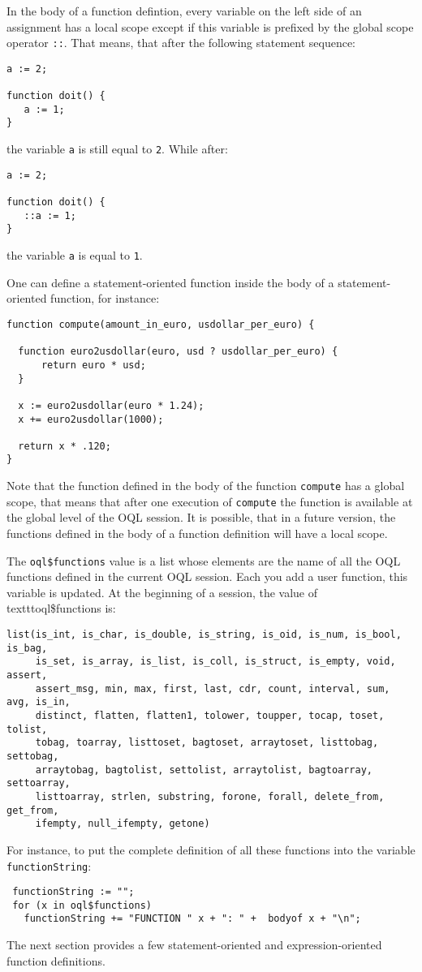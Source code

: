 In the body of a function defintion, every variable on the left side of an
assignment has a local scope except if this variable is prefixed by
the global scope operator \texttt{::}.
That means, that after the following statement sequence:
\begin{verbatim}
a := 2;

function doit() {
   a := 1;
}
\end{verbatim}
the variable \texttt{a} is still equal to \texttt{2}. While after:
\begin{verbatim}
a := 2;

function doit() {
   ::a := 1;
}
\end{verbatim}
the variable \texttt{a} is equal to \texttt{1}.

One can define a statement-oriented function inside the body of
a statement-oriented function, for instance:
\begin{verbatim}
function compute(amount_in_euro, usdollar_per_euro) {

  function euro2usdollar(euro, usd ? usdollar_per_euro) {
      return euro * usd;
  }

  x := euro2usdollar(euro * 1.24);
  x += euro2usdollar(1000);

  return x * .120;
}
\end{verbatim}

Note that the function defined in the body of the function \texttt{compute}
has a global scope, that means that after one execution of \texttt{compute}
the function is available at the global level of the OQL session.
It is possible, that in a future version, the functions defined in
the body of a function definition will have a local scope.

The \texttt{oql\$functions} value is a list whose elements are the name of all
the OQL functions
defined in the current OQL session. Each you add a user function,
this variable is updated.
At the beginning of a session,
the value of \\texttt{oql\$functions} is:
\begin{verbatim}
list(is_int, is_char, is_double, is_string, is_oid, is_num, is_bool, is_bag,
     is_set, is_array, is_list, is_coll, is_struct, is_empty, void, assert,
     assert_msg, min, max, first, last, cdr, count, interval, sum, avg, is_in,
     distinct, flatten, flatten1, tolower, toupper, tocap, toset, tolist,
     tobag, toarray, listtoset, bagtoset, arraytoset, listtobag, settobag,
     arraytobag, bagtolist, settolist, arraytolist, bagtoarray, settoarray,
     listtoarray, strlen, substring, forone, forall, delete_from, get_from,
     ifempty, null_ifempty, getone)
\end{verbatim}
For instance, to put the complete definition of all
these functions into the variable \texttt{functionString}:
\begin{verbatim}
 functionString := "";
 for (x in oql$functions)
   functionString += "FUNCTION " x + ": " +  bodyof x + "\n";
\end{verbatim}
The next section provides a few statement-oriented and
expression-oriented function definitions.


